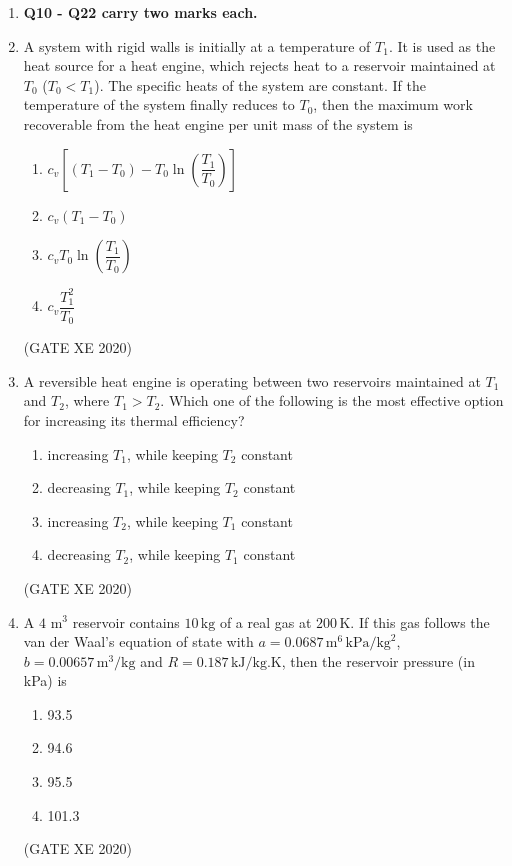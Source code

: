 \documentclass[12pt]{article}
\begin{document}
\begin{enumerate}
\item[] \textbf{Q10 - Q22 carry two marks each.}
\item A system with rigid walls is initially at a temperature of $T_1$. It is used as the heat source for a heat engine, which rejects heat to a reservoir maintained at $T_0$ ($T_0 < T_1$). The specific heats of the system are constant. If the temperature of the system finally reduces to $T_0$, then the maximum work recoverable from the heat engine per unit mass of the system is
\begin{enumerate}
\item $c_v \left[ (T_1 - T_0) - T_0 \ln \left( \dfrac{T_1}{T_0} \right) \right]$
\item $c_v (T_1 - T_0)$
\item $c_v T_0 \ln \left( \dfrac{T_1}{T_0} \right)$
\item $c_v \dfrac{T_1^2}{T_0}$
\end{enumerate}
(GATE XE 2020)

\item A reversible heat engine is operating between two reservoirs maintained at $T_1$ and $T_2$, where $T_1 > T_2$. Which one of the following is the most effective option for increasing its thermal efficiency?
\begin{enumerate}
\item increasing $T_1$, while keeping $T_2$ constant
\item decreasing $T_1$, while keeping $T_2$ constant
\item increasing $T_2$, while keeping $T_1$ constant
\item decreasing $T_2$, while keeping $T_1$ constant
\end{enumerate}
(GATE XE 2020)

\item A $4\text{ m}^3$ reservoir contains $10 \,\text{kg}$ of a real gas at $200 \,\text{K}$. If this gas follows the van der Waal’s equation of state with $a = 0.0687 \,\text{m}^6 \,\text{kPa}/\text{kg}^2$, $b = 0.00657 \,\text{m}^3/\text{kg}$ and $R = 0.187 \,\text{kJ/kg.K}$, then the reservoir pressure (in kPa) is
\begin{enumerate}
\item 93.5
\item 94.6
\item 95.5
\item 101.3
\end{enumerate}
(GATE XE 2020)


\end{enumerate}
\end{document}
